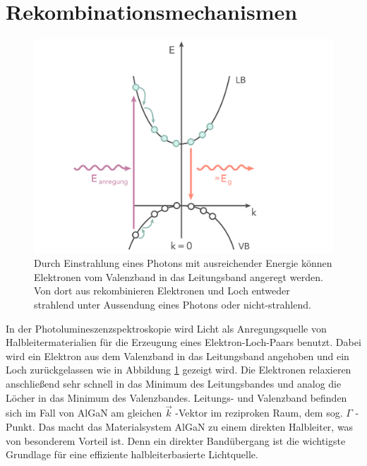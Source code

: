 
\thispagestyle{fancy}


\section{Rekombinationsmechanismen}
%
\begin{figure}[h]
\centering
\begin{minipage}[t]{1\linewidth}
\centering
\includegraphics[width=0.8\linewidth]{Bilder/bandrekomb.png}
\end{minipage}%
\caption{Durch Einstrahlung eines Photons mit ausreichender Energie können Elektronen vom Valenzband in das Leitungsband angeregt werden. Von dort aus rekombinieren Elektronen und Loch entweder strahlend unter Aussendung eines Photons oder nicht-strahlend.}
 \label{fig:bandrekomb}
\end{figure}
\noindent
In der Photolumineszenzspektroskopie wird Licht als Anregungsquelle von Halbleitermaterialien für die Erzeugung eines Elektron-Loch-Paars benutzt. Dabei wird ein Elektron aus dem Valenzband in das Leitungsband angehoben und ein Loch zurückgelassen wie in Abbildung \ref{fig:bandrekomb} gezeigt wird. Die Elektronen relaxieren anschließend sehr schnell in das Minimum des Leitungsbandes und analog die Löcher in das Minimum des Valenzbandes. 
\newline
Leitungs- und Valenzband befinden sich im Fall von AlGaN am gleichen $\vec{k}$ -Vektor im reziproken Raum, dem sog. $\Gamma$ -Punkt. Das macht das Materialsystem AlGaN zu einem direkten Halbleiter, was von besonderem Vorteil ist. Denn ein direkter Bandübergang ist die wichtigste Grundlage für eine effiziente halbleiterbasierte Lichtquelle. 
